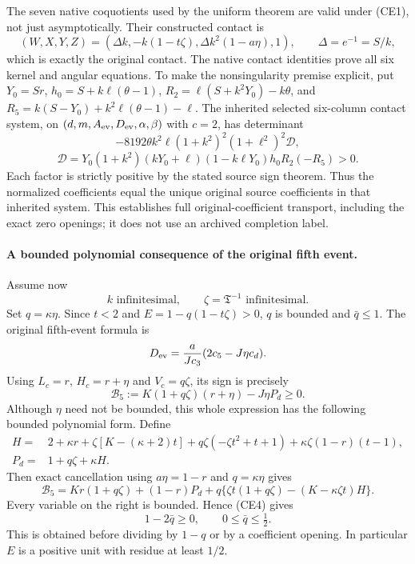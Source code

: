 The seven native coquotients used by the uniform theorem are valid
under (CE1), not just asymptotically. Their constructed contact is
\[
 (W,X,Y,Z)=(\Delta k,-k(1-t\zeta),\Delta k^2(1-a\eta),1),
 \qquad \Delta=e^{-1}=S/k,
\]
which is exactly the original contact. The native contact identities
prove all six kernel and angular equations. To make the nonsingularity
premise explicit, put $Y_0=Sr$, $h_0=S+k\ell(\theta-1)$,
$R_2=\ell(S+k^2Y_0)-k\theta$, and
$R_5=k(S-Y_0)+k^2\ell(\theta-1)-\ell$. The inherited selected
six-column contact system, on $(d,m,A_{\rm ev},D_{\rm ev},\alpha,\beta)$
with $c=2$, has determinant
\[
 -8192\theta k^2\ell(1+k^2)^2(1+\ell^2)^2\mathcal D,
\]
\[
 \mathcal D=Y_0(1+k^2)(kY_0+\ell)(1-k\ell Y_0)h_0R_2(-R_5)>0.
\]
Each factor is strictly positive by the stated source sign theorem.
Thus the normalized coefficients equal the unique original source
coefficients in that inherited system. This
establishes full original-coefficient transport, including the exact
zero openings; it does not use an archived completion label.

\paragraph{A bounded polynomial consequence of the original fifth event.}
Assume now
\[
                 k\text{ infinitesimal},\qquad
                 \zeta=\mathfrak T^{-1}\text{ infinitesimal}.     \tag{CE3}
\]
Set $q=\kappa\eta$. Since $t<2$ and $E=1-q(1-t\zeta)>0$, $q$ is
bounded and $\bar q\le1$. The original fifth-event formula is
\[
 D_{\rm ev}=\frac{a}{Jc_3}(2c_5-J\eta c_d).
\]
Using $L_c=r$, $H_c=r+\eta$ and $V_c=q\zeta$, its sign is precisely
\[
 \mathcal B_5:=K(1+q\zeta)(r+\eta)-J\eta P_d\ge0.       \tag{CE4}
\]
Although $\eta$ need not be bounded, this whole expression has the
following bounded polynomial form. Define
\begin{align*}
 H={}&2+\kappa r+\zeta[K-(\kappa+2)t]
     +q\zeta(-\zeta t^2+t+1)
     +\kappa\zeta(1-r)(t-1),\\
 P_d={}&1+q\zeta+\kappa H.
\end{align*}
Then exact cancellation using $a\eta=1-r$ and $q=\kappa\eta$ gives
\[
 \mathcal B_5=Kr(1+q\zeta)+(1-r)P_d
       +q\{\zeta t(1+q\zeta)-(K-\kappa\zeta t)H\}.     \tag{CE5}
\]
Every variable on the right is bounded. Hence (CE4) gives
\[
       1-2\bar q\ge0,\qquad 0\le\bar q\le\tfrac12.     \tag{CE6}
\]
This is obtained before dividing by $1-q$ or by a coefficient opening.
In particular $E$ is a positive unit with residue at least $1/2$.

